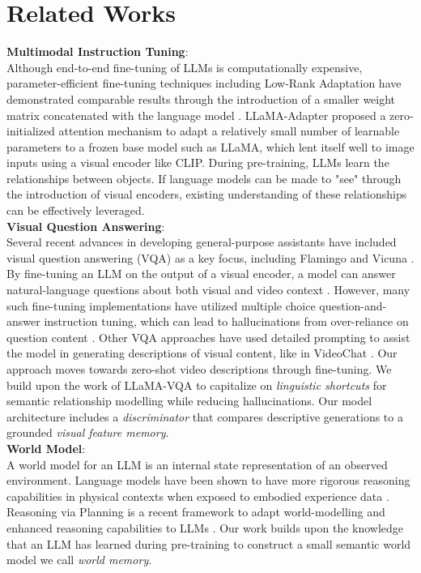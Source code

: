 \documentclass[conference]{IEEEtran}
\begin{document}
\section{Related Works}
\noindent
\textbf{Multimodal Instruction Tuning}:
\\
Although end-to-end fine-tuning of LLMs is computationally expensive, parameter-efficient fine-tuning techniques including Low-Rank Adaptation have demonstrated comparable results through the introduction of a smaller weight matrix concatenated with the language model \cite{xu2023parameterefficient}\cite{hu2021lora}. LLaMA-Adapter proposed a zero-initialized attention mechanism to adapt a relatively small number of learnable parameters to a frozen base model such as LLaMA, which lent itself well to image inputs using a visual encoder like CLIP\cite{zhang2023llamaadapter}\cite{radford2021learning}. During pre-training, LLMs learn the relationships between objects. If language models can be made to "see" through the introduction of visual encoders, existing understanding of these relationships can be effectively leveraged.
\\
\textbf{Visual Question Answering}:
\\
Several recent advances in developing general-purpose assistants have included visual question answering (VQA) as a key focus, including Flamingo and Vicuna \cite{alayrac2022flamingo}\cite{vicuna2023}. By fine-tuning an LLM on the output of a visual encoder, a model can answer natural-language questions about both visual and video context \cite{liu2023visual}. However, many such fine-tuning implementations have utilized multiple choice question-and-answer instruction tuning, which can lead to hallucinations from over-reliance on question content \cite{ko2023large}. Other VQA approaches have used detailed prompting to assist the model in generating descriptions of visual content, like in VideoChat \cite{li2024videochat}. Our approach moves towards zero-shot video descriptions through fine-tuning. We build upon the work of LLaMA-VQA to capitalize on \textit{linguistic shortcuts} for semantic relationship modelling while reducing hallucinations. Our model architecture includes a \textit{discriminator} that compares descriptive generations to a grounded \textit{visual feature memory}.
\\
\textbf{World Model}:
\\
A world model for an LLM is an internal state representation of an observed environment. Language models have been shown to have more rigorous reasoning capabilities in physical contexts when exposed to embodied experience data \cite{xiang2023language}. Reasoning via Planning is a recent framework to adapt world-modelling and enhanced reasoning capabilities to LLMs \cite{hao2023reasoning}. Our work builds upon the knowledge that an LLM has learned during pre-training to construct a small semantic world model we call \textit{world memory}.
\end{document}
